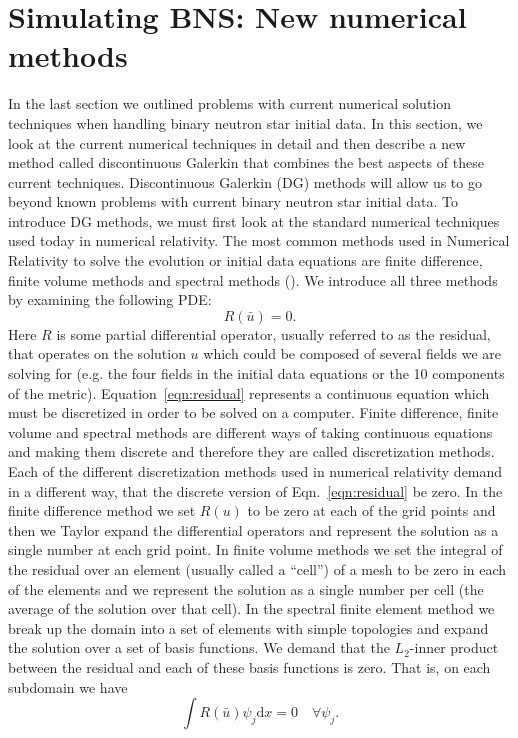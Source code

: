 \section{Simulating BNS: New numerical methods}

In the last section we outlined problems with current numerical solution techniques when handling binary neutron star initial data. In this section, we look at the current numerical techniques in detail and then describe a new method called discontinuous Galerkin that combines the best aspects of these current techniques. Discontinuous Galerkin (DG) methods will allow us to go beyond known problems with current binary neutron star initial data.
To introduce DG methods, we must first look at the standard numerical techniques used today in numerical relativity. The most common methods used in Numerical Relativity to solve the evolution or initial data equations are finite difference, finite volume methods and spectral methods (\cite{baumgarte2010numerical}). We introduce all three methods by examining the following PDE:
%
\begin{equation}
  \label{eqn:residual}
 R(\bar u) = 0.
\end{equation}
%
Here $R$ is some partial differential operator, usually referred to as the residual, that operates on the solution $u$ which could be composed of several fields we are solving for (e.g. the four fields in the initial data equations or the 10 components of the metric). Equation~\ref{eqn:residual} represents a continuous equation which must be discretized in order to be solved on a computer. Finite difference, finite volume and spectral methods are different ways of taking continuous equations and making them discrete and therefore they are called discretization methods. Each of the different discretization methods used in numerical relativity demand in a different way, that the discrete version of Eqn.~\ref{eqn:residual} be zero. In the finite difference method we set $R(u)$ to be zero at each of the grid points and then we Taylor expand the differential operators and represent the solution as a single number at each grid point. In finite volume methods we set the integral of the residual over an element (usually called a ``cell'') of a mesh to be zero in each of the elements and we represent the solution as a single number per cell (the average of the solution over that cell). In the spectral finite element method we break up the domain into a set of elements with simple topologies and expand the solution over a set of basis functions. We demand that the $L_2$-inner product between the residual and each of these basis functions is zero. That is, on each subdomain we have
%
\begin{equation}
  \label{eqn:l2orthog}
 \int R(\bar u)\psi_j  \mathrm{d}x = 0 \quad \forall \psi_j.
\end{equation}
%

